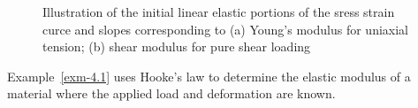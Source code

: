 \documentclass[
  letterpaper,
  DIV=11,
  numbers=noendperiod]{scrreprt}
\theoremstyle{definition}
\theoremstyle{remark}
\begin{document}
\begin{figure}


\caption{\label{fig-4.6}Illustration of the initial linear elastic
portions of the sress strain curce and slopes corresponding to (a)
Young's modulus for uniaxial tension; (b) shear modulus for pure shear
loading}

\end{figure}%

Example~\ref{exm-4.1} uses Hooke's law to determine the elastic modulus
of a material where the applied load and deformation are known.
\end{document}
